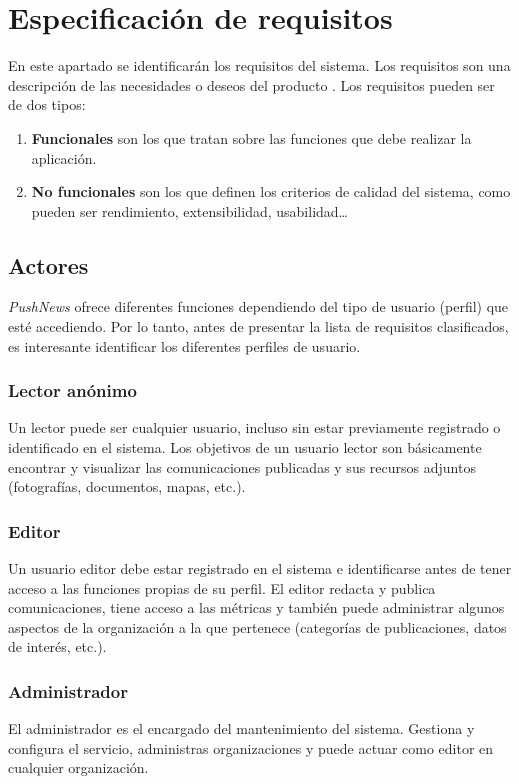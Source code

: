 \chapter{Especificación de requisitos}
En este apartado se identificarán los requisitos del sistema. Los requisitos son una descripción de las necesidades o deseos del producto \cite{Larman2004}. Los requisitos pueden ser de dos tipos:
\begin{enumerate}
    \item \textbf{Funcionales} son los que tratan sobre las funciones que debe realizar la aplicación.
    \item \textbf{No funcionales} son los que definen los criterios de calidad del sistema, como pueden ser rendimiento, extensibilidad, usabilidad\dots
\end{enumerate}

\section {Actores}
\emph{PushNews} ofrece diferentes funciones dependiendo del tipo de usuario (perfil) que esté accediendo. Por lo tanto, antes de presentar la lista de requisitos clasificados, es interesante identificar los diferentes perfiles de usuario.

\subsection{Lector anónimo}
Un lector puede ser cualquier usuario, incluso sin estar previamente registrado o identificado en el sistema. Los objetivos de un usuario lector son básicamente encontrar y visualizar las comunicaciones publicadas y sus recursos adjuntos (fotografías, documentos, mapas, etc.).

\subsection{Editor}
Un usuario editor debe estar registrado en el sistema e identificarse antes de tener acceso a las funciones propias de su perfil. El editor redacta y publica comunicaciones, tiene acceso a las métricas y también puede administrar algunos aspectos de la organización a la que pertenece (categorías de publicaciones, datos de interés, etc.).

\subsection{Administrador}
El administrador es el encargado del mantenimiento del sistema. Gestiona y configura el servicio, administras organizaciones y puede actuar como editor en cualquier organización.


